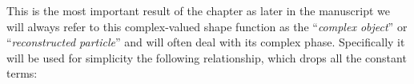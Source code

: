 

 



This is the most important result of the chapter as later in the manuscript we will always refer to this complex-valued 
shape function as the ``\textit{complex object}'' or ``\textit{reconstructed particle}'' and will often deal with its 
complex phase. Specifically it will be used for simplicity the following relationship, which drops all the constant terms: 

